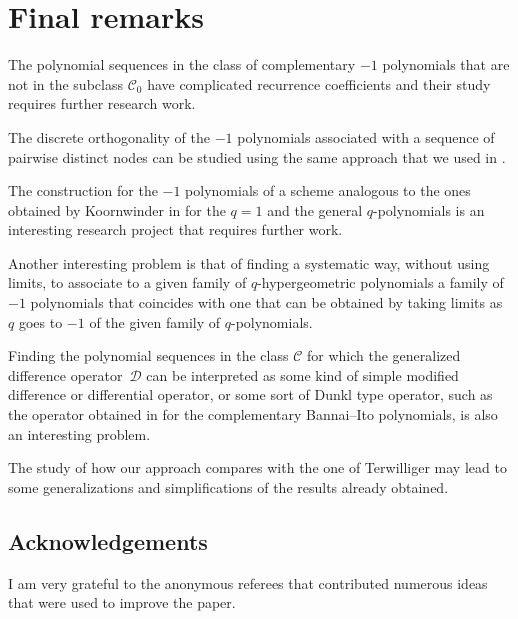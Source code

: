 \documentclass[pdftex]{sigma}
\def\cC{\mathcal C}
\def\cD{\mathcal D}
\numberwithin{equation}{section}
\begin{document}
\section{Final remarks}\label{section8}
The polynomial sequences in the class of complementary $-1$ polynomials that are not in the subclass $\cC_0$ have complicated recurrence coefficients and their study requires further research work.

The discrete orthogonality of the $-1$ polynomials associated with a sequence of pairwise distinct nodes can be studied using the same approach that we used in \cite{qdiscr}.

The construction for the $-1$ polynomials of a scheme analogous to the ones obtained by Koornwinder in \cite{KAsk,K2,K3} for the $q=1$ and the general $q$-polynomials is an interesting research project that requires further work.

Another interesting problem is that of finding a systematic way, without using limits, to associate to a given family of $q$-hypergeometric polynomials a family of $-1$ polynomials that coincides with one that can be obtained by taking limits as $q$ goes to $-1$ of the given family of $q$-polynomials.

 Finding the polynomial sequences in the class $\cC$ for which the generalized difference operator~$\cD$ can be interpreted as some kind of simple modified difference or differential operator, or some sort of Dunkl type operator, such as the operator obtained in \cite{GenVZ2} for the complementary Bannai--Ito polynomials, is also an interesting problem.

The study of how our approach compares with the one of Terwilliger may lead to some generalizations and simplifications of the results already obtained.


\subsection*{Acknowledgements}
I am very grateful to the anonymous referees that contributed numerous ideas that were used to improve the paper.
\end{document}
